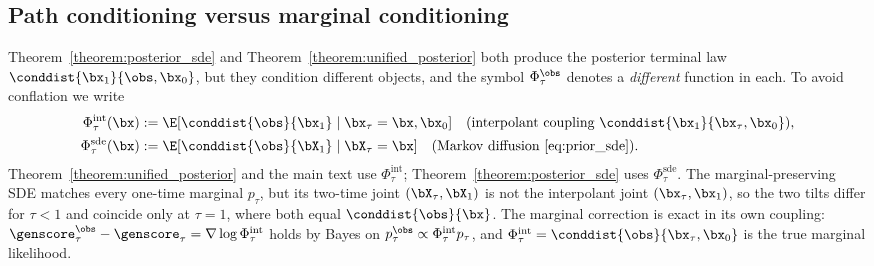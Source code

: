 \subsection{Path conditioning versus marginal conditioning}
\label{subsec:doob_vs_marginal}
Theorem~\ref{theorem:posterior_sde} and Theorem~\ref{theorem:unified_posterior} both produce the posterior terminal law $\conddist{\bx_1}{\obs,\bx_0}$, but they condition different objects, and the symbol $\Phi_\tau^{\obs}$ denotes a \emph{different} function in each. To avoid conflation we write
\begin{align}
    \Phi_\tau^{\mathrm{int}}(\bx) &:= \E[\conddist{\obs}{\bx_1}\mid\bx_\tau=\bx,\bx_0] \quad\text{(interpolant coupling $\conddist{\bx_1}{\bx_\tau,\bx_0}$)}, \\
    \Phi_\tau^{\mathrm{sde}}(\bx) &:= \E[\conddist{\obs}{\bX_1}\mid\bX_\tau=\bx] \quad\text{(Markov diffusion \eqref{eq:prior_sde})}.
\end{align}
Theorem~\ref{theorem:unified_posterior} and the main text use $\Phi_\tau^{\mathrm{int}}$; Theorem~\ref{theorem:posterior_sde} uses $\Phi_\tau^{\mathrm{sde}}$. The marginal-preserving SDE matches every one-time marginal $p_\tau$, but its two-time joint $(\bX_\tau,\bX_1)$ is not the interpolant joint $(\bx_\tau,\bx_1)$, so the two tilts differ for $\tau<1$ and coincide only at $\tau=1$, where both equal $\conddist{\obs}{\bx}$. The marginal correction is exact in its own coupling: $\genscore_\tau^{\obs}-\genscore_\tau=\nabla\log\Phi_\tau^{\mathrm{int}}$ holds by Bayes on $p_\tau^{\obs}\propto\Phi_\tau^{\mathrm{int}}p_\tau$, and $\Phi_\tau^{\mathrm{int}}=\conddist{\obs}{\bx_\tau,\bx_0}$ is the true marginal likelihood.

